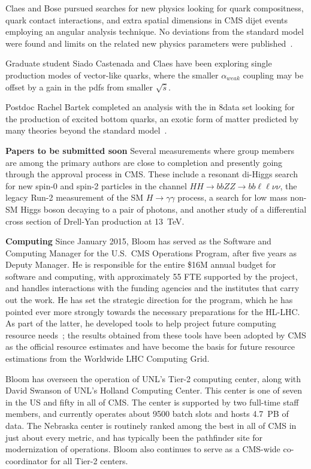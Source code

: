 Claes and Bose pursued searches for new physics looking for quark compositness, quark contact interactions, and extra spatial dimensions in CMS dijet events employing an angular analysis technique. No deviations from the standard model were found and limits on the related new physics parameters were published~\cite{bib:quark-compositness-etc}.

Graduate student Siado Castenada and Claes have been exploring single production modes of vector-like quarks, where the smaller $\alpha_{weak}$ coupling may be offset by a gain in the pdfs from smaller $\sqrt{\hat{s}}$.

Postdoc Rachel Bartek completed an analysis with the in 8\TeV data set looking for the production of excited bottom quarks, an exotic form of matter predicted by many theories beyond the standard model~\cite{bib:bstar}. 

{\bf Papers to be submitted soon} Several measurements where group members are among the primary authors are close to completion and presently going through the approval process in CMS. These include a resonant di-Higgs search for new spin-0 and spin-2 particles in the channel $HH\to bbZZ\to bb\ell\ell\nu\nu$, the legacy Run-2 measurement of the SM $H\to\gamma\gamma$ process, a search for low mass non-SM Higgs boson decaying to a pair of photons, and another study of a differential cross section of Drell-Yan production at 13~TeV. 

{\bf Computing} Since January 2015, Bloom has served as the Software and
Computing Manager for the U.S.~CMS Operations Program, after
five years as Deputy Manager.  He is responsible for the entire \$16M
annual budget for software and computing, with approximately 55 FTE
supported by the project, and handles interactions with the funding
agencies and the institutes that carry out the work.  He
has set the strategic direction for the program, which he has pointed ever
more strongly towards the necessary preparations for the HL-LHC.  As part
of the latter, he developed tools to help project future computing resource
needs~\cite{bib:resource-modeling}; the results obtained from these tools
have been adopted by CMS as the official resource estimates and have
become the basis for future resource estimations from the Worldwide LHC
Computing Grid.

Bloom has overseen the operation of UNL's Tier-2 computing center, along with David Swanson of UNL's Holland Computing Center. This center is one of seven in the US and fifty in all of CMS. The center is supported by two full-time staff members, and currently operates about 9500 batch slots and hosts 4.7~PB of data. The Nebraska center is routinely ranked among the best in all of CMS in just about every metric, and has typically been the pathfinder site for modernization of operations. Bloom also continues to serve as a CMS-wide co-coordinator for all Tier-2 centers.

